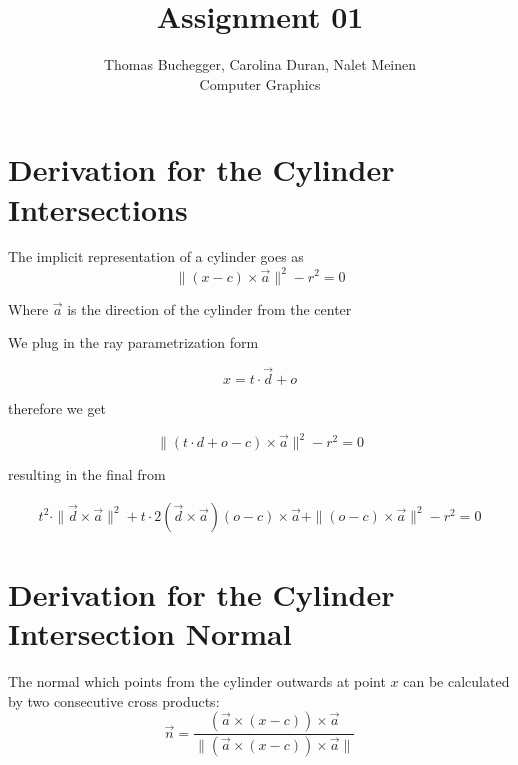 \documentclass[12pt]{article}
\begin{document}


\title{Assignment 01}%
\author{Thomas Buchegger, Carolina Duran, Nalet Meinen \\ %
Computer Graphics
}

\maketitle

\section{Derivation for the Cylinder Intersections}

The implicit representation of a cylinder goes as
\[ \|(x - c) \times \vec a\|^2 - r^2 = 0 \]

\noindent Where $\vec a$ is the direction of the cylinder from the center 
\newline

\noindent We plug in the ray parametrization form

\[ x = t \cdot \vec d + o \]

\noindent therefore we get

\[ \|(t \cdot d + o - c) \times \vec a\|^2 - r^2 = 0 \]


\noindent resulting in the final from

\begin{align*} t^2 \cdot \|\vec d \times \vec a\|^2 + t\cdot 2(\vec d \times \vec a)(o-c)\times \vec a + \|(o-c)\times \vec a\|^2 -r^2 = 0
\end{align*}

\section{Derivation for the Cylinder Intersection Normal}
The normal which points from the cylinder outwards at point $x$ can be calculated by two consecutive cross products:
 \[ \vec n = \frac{(\vec a \times (x-c))\times \vec a}{\|(\vec a \times (x-c))\times \vec a\|}\]
\end{document}
